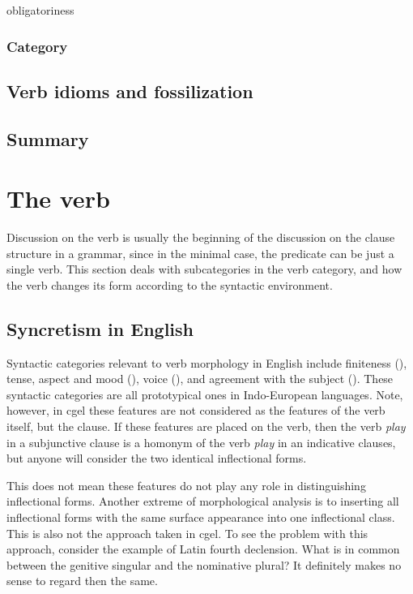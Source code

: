 \documentclass{article}
\newcommand*{\corpus}[1]{\emph{#1}}
\begin{document}
obligatoriness 

\subsubsection{Category}

\subsection{Verb idioms and fossilization}

\subsection{Summary}



\section{The verb}

Discussion on the verb is usually the beginning of the discussion on the clause structure in a grammar,
since in the minimal case, 
the predicate can be just a single verb.
This section deals with subcategories in the verb category,
and how the verb changes its form according to the syntactic environment.

\subsection{Syncretism in English}

Syntactic categories relevant to verb morphology in English include 
finiteness (),
tense, aspect and mood (),
voice (),
and agreement with the subject ().
These syntactic categories are all prototypical ones in Indo-European languages.
Note, however, in \ac{cgel} these features are not considered as the features of the verb itself,
but the clause. 
If these features are placed on the verb, 
then the verb \corpus{play} in a subjunctive clause is a homonym of 
the verb \corpus{play} in an indicative clauses,
but anyone will consider the two identical inflectional forms.

This does not mean these features do not play any role in distinguishing inflectional forms.
Another extreme of morphological analysis is to 
inserting all inflectional forms with the same surface appearance into one inflectional class.
This is also not the approach taken in \ac{cgel}.
To see the problem with this approach, consider the example of Latin fourth declension.
What is in common between the genitive singular and the nominative plural?
It definitely makes no sense to regard then the same.
\end{document}
